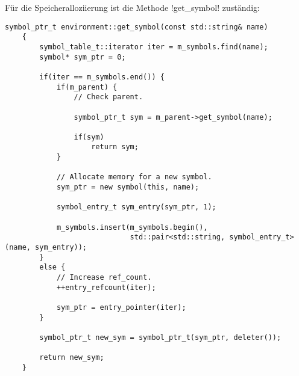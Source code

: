 Für die Speicheralloziierung ist die Methode !get_symbol! zuständig:

\begin{lstlisting}[caption={Speicheralloziierung}, label=lst:get_symbol]
    symbol_ptr_t environment::get_symbol(const std::string& name)
    {
        symbol_table_t::iterator iter = m_symbols.find(name);
        symbol* sym_ptr = 0;

        if(iter == m_symbols.end()) {
            if(m_parent) {
                // Check parent.

                symbol_ptr_t sym = m_parent->get_symbol(name);

                if(sym)
                    return sym;
            }

            // Allocate memory for a new symbol.
            sym_ptr = new symbol(this, name);

            symbol_entry_t sym_entry(sym_ptr, 1);

            m_symbols.insert(m_symbols.begin(),
                             std::pair<std::string, symbol_entry_t>(name, sym_entry));
        }
        else {
            // Increase ref_count.
            ++entry_refcount(iter);

            sym_ptr = entry_pointer(iter);
        }

        symbol_ptr_t new_sym = symbol_ptr_t(sym_ptr, deleter());

        return new_sym;
    }
\end{lstlisting}
